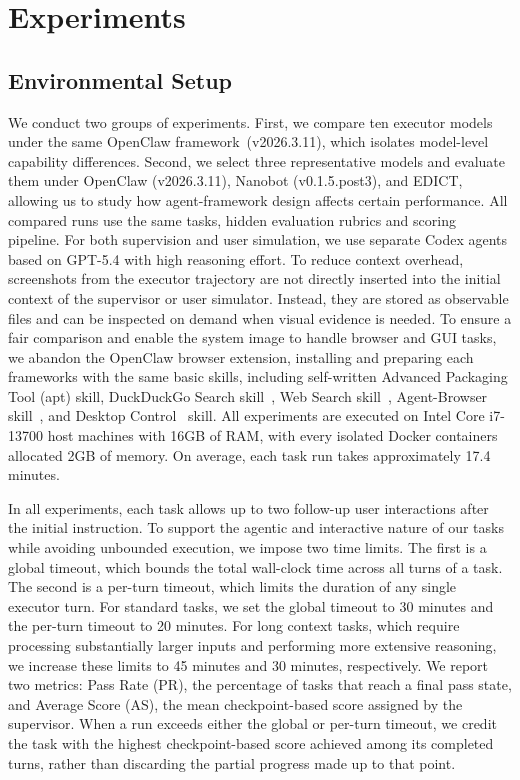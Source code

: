 \section{Experiments}
\label{sec:experiment}
\subsection{Environmental Setup}
We conduct two groups of experiments. First, we compare ten executor models under the same OpenClaw framework~(v2026.3.11), which isolates model-level capability differences. Second, we select three representative models and evaluate them under OpenClaw (v2026.3.11), Nanobot (v0.1.5.post3), and EDICT, allowing us to study how agent-framework design affects certain performance. All compared runs use the same tasks, hidden evaluation rubrics and scoring pipeline. For both supervision and user simulation, we use separate Codex agents based on GPT-5.4 with high reasoning effort. To reduce context overhead, screenshots from the executor trajectory are not directly inserted into the initial context of the supervisor or user simulator. Instead, they are stored as observable files and can be inspected on demand when visual evidence is needed. To ensure a fair comparison and enable the system image to handle browser and GUI tasks, we abandon the OpenClaw browser extension, installing and preparing each frameworks with the same basic skills, including self-written Advanced Packaging Tool (apt) skill, DuckDuckGo Search skill~\cite{duckduckgo}, Web Search skill~\cite{websearch}, Agent-Browser skill~\cite{agentbrowser}, and Desktop Control~\cite{desktopcontrol} skill. All experiments are executed on Intel Core i7-13700 host machines with 16GB of RAM, with every isolated Docker containers allocated 2GB of memory. On average, each task run takes approximately 17.4 minutes.

In all experiments, each task allows up to two follow-up user interactions after the initial instruction. To support the agentic and interactive nature of our tasks while avoiding unbounded execution, we impose two time limits. The first is a global timeout, which bounds the total wall-clock time across all turns of a task. The second is a per-turn timeout, which limits the duration of any single executor turn. For standard tasks, we set the global timeout to 30 minutes and the per-turn timeout to 20 minutes. For long context tasks, which require processing substantially larger inputs and performing more extensive reasoning, we increase these limits to 45 minutes and 30 minutes, respectively. We report two metrics: Pass Rate (PR), the percentage of tasks that reach a final pass state, and Average Score (AS), the mean checkpoint-based score assigned by the supervisor. When a run exceeds either the global or per-turn timeout, we credit the task with the highest checkpoint-based score achieved among its completed turns, rather than discarding the partial progress made up to that point.

